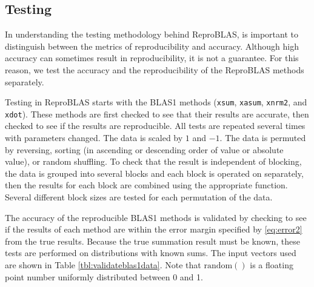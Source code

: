 \subsection{Testing}
  In understanding the testing methodology behind ReproBLAS, is important to distinguish between the metrics of reproducibility and accuracy. Although high accuracy can sometimes result in reproducibility, it is not a guarantee. For this reason, we test the accuracy and the reproducibility of the ReproBLAS methods separately.

  Testing in ReproBLAS starts with the BLAS1 methods (\texttt{xsum}, \texttt{xasum}, \texttt{xnrm2}, and \texttt{xdot}). These methods are first checked to see that their results are accurate, then checked to see if the results are reproducible. All tests are repeated several times with parameters changed. The data is scaled by $1$ and $-1$. The data is permuted by reversing, sorting (in ascending or descending order of value or absolute value), or random shuffling. To check that the result is independent of blocking, the data is grouped into several blocks and each block is operated on separately, then the results for each block are combined using the appropriate function. Several different block sizes are tested for each permutation of the data.

  The accuracy of the reproducible BLAS1 methods is validated by checking to see if the results of each method are within the error margin specified by \eqref{eq:error2} from the true results. Because the true summation result must be known, these tests are performed on distributions with known sums. The input vectors used are shown in Table \ref{tbl:validateblas1data}. Note that $\text{random}()$ is a floating point number uniformly distributed between 0 and 1.

